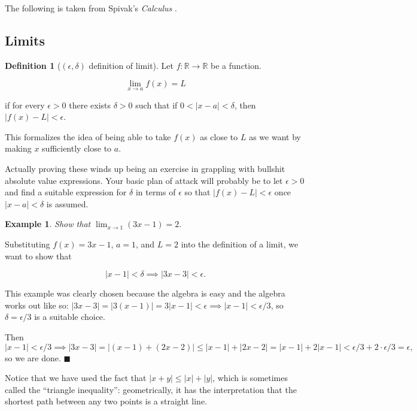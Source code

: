 \documentclass{article}
\begin{document}
The following is taken from Spivak's {\it Calculus} \cite{spivak}.

\subsection{Limits}

\theoremstyle{definition}
\newtheorem{definition}{Definition}
\newtheorem{example}{Example}
\newtheorem{theorem}{Theorem}

\begin{definition}[$(\epsilon, \delta)$ definition of limit]

Let $f: \mathbb{R} \to \mathbb{R}$ be a function. 

\begin{equation}
\lim_{x \to a} f(x) = L
\end{equation}

if for every $\epsilon > 0$ there exists $\delta > 0$ such that if $0 < |x-a| <
\delta$, then $|f(x) - L| < \epsilon$.
 
\end{definition}

This formalizes the idea of being able to take $f(x)$ as close to $L$ as we want
by making $x$ sufficiently close to $a$.

Actually proving these winds up being an exercise in grappling with bullshit
absolute value expressions. Your basic plan of attack will probably be to let
$\epsilon > 0$ and find a suitable expression for $\delta$ in terms of
$\epsilon$ so that $|f(x) -L| < \epsilon$ once $|x-a|< \delta$ is assumed.

\begin{example} 

\emph{Show that $\lim_{x \to 1} (3x-1) = 2$}.

Substituting $f(x) = 3x-1$, $a = 1$, and $L = 2$ into the definition of a limit,
we want to show that

\begin{equation}
|x - 1| < \delta \implies |3x - 3| < \epsilon.
\end{equation}

This example was clearly chosen because the algebra is easy and the algebra
works out like so: $|3x-3| = |3(x-1)| = 3|x-1| < \epsilon \implies |x-1| <
\epsilon/3$, so $\delta = \epsilon/3$ is a suitable choice.

Then $|x - 1| < \epsilon/3 \implies |3x-3| = |(x - 1) + (2x-2)| \leq |x-1| +
|2x-2| = |x-1| + 2|x-1| < \epsilon/3 + 2 \cdot \epsilon/3 = \epsilon,$ so we are
done. $\blacksquare$

Notice that we have used the fact that $|x + y| \leq |x| + |y|$, which is
sometimes called the ``triangle inequality'': geometrically, it has the
interpretation that the shortest path between any two points is a straight line.

\end{example}
\end{document}
